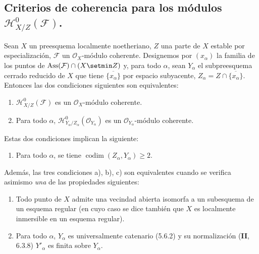 \subsection{\texorpdfstring{Criterios de coherencia para los módulos
$\mathcal H^0_{X/Z}(\mathcal F)$.}{Criterios de coherencia para los módulos H\string^0\string_(F)}}

\begin{proposition}[5.11.1]
\label{IV.2.s5.11.1-fr}
Sean $X$ un preesquema localmente noetheriano, $Z$ una parte de $X$ estable por
especialización, $\mathcal F$ un $\mathcal O_X$-módulo coherente. Designemos por
$(x_\alpha)$ la familia de los puntos de
$\operatorname{Ass}(\mathcal F)\cap(X\setmin Z)$ y, para todo $\alpha$, sean
$Y_\alpha$ el subpreesquema cerrado reducido de $X$ que tiene
$\overline{\{x_\alpha\}}$ por espacio subyacente,
$Z_\alpha=Z\cap\overline{\{x_\alpha\}}$. Entonces las dos condiciones siguientes
son equivalentes:
\begin{enumerate}
\item[\textup{a)}] $\mathcal H^0_{X/Z}(\mathcal F)$ es un $\mathcal O_X$-módulo
coherente.
\item[\textup{b)}] Para todo $\alpha$,
$\mathcal H^0_{Y_\alpha/Z_\alpha}(\mathcal O_{Y_\alpha})$ es un
$\mathcal O_{Y_\alpha}$-módulo coherente.
\end{enumerate}
Estas dos condiciones implican la siguiente:
\begin{enumerate}
\item[\textup{c)}] Para todo $\alpha$, se tiene
$\operatorname{codim}(Z_\alpha,Y_\alpha)\geq2$.
\end{enumerate}
Además, las tres condiciones \textup{a), b), c)} son equivalentes cuando se verifica
asimismo \emph{una} de las propiedades siguientes:
\begin{enumerate}
\item[\textup{(i)}] Todo punto de $X$ admite una vecindad abierta isomorfa a un
subesquema de un esquema regular \textup{(en cuyo caso se dice también que $X$ es}
localmente inmersible en un esquema regular\textup{)}.
\item[\textup{(ii)}] Para todo $\alpha$, $Y_\alpha$ es universalmente catenario
\textup{(5.6.2)} y su normalización \textup{(\textbf{II}, 6.3.8)} $Y'_\alpha$ es finita sobre $Y_\alpha$.
\end{enumerate}
\end{proposition}

